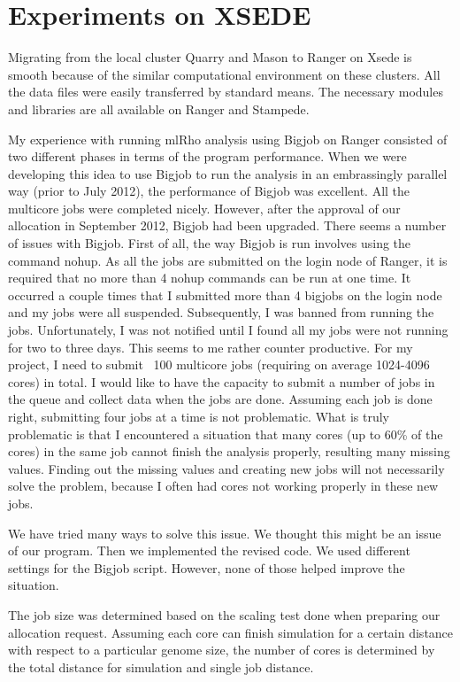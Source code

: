 \documentclass{sig-alternate}
\begin{document}
\section{Experiments on XSEDE}{\label{sec:experiments}
Migrating from the local cluster Quarry and Mason to Ranger on Xsede is smooth because of the similar computational environment on these clusters. All the data files were easily transferred by standard means. The necessary modules and libraries are all available on Ranger and Stampede.
 
My experience with running mlRho analysis using Bigjob on Ranger consisted of two different phases in terms of the program performance. When we were developing this idea to use Bigjob to run the analysis in an embrassingly parallel way (prior to July 2012), the performance of Bigjob was excellent. All the multicore jobs were completed nicely. However, after the approval of our allocation in September 2012, Bigjob had been upgraded. There seems a number of issues with Bigjob. First of all, the way Bigjob is run involves using the command nohup. As all the jobs are submitted on the login node of Ranger, it is required that no more than 4 nohup commands can be run at one time. It occurred a couple times that I submitted more than 4 bigjobs on the login node and my jobs were all suspended. Subsequently, I was banned from running the jobs. Unfortunately, I was not notified until I found all my jobs were not running for two to three days. This seems to me rather counter productive. For my project, I need to submit ~100 multicore jobs (requiring on average 1024-4096 cores) in total. I would like to have the capacity to submit a number of jobs in the queue and collect data when the jobs are done. Assuming each job is done right, submitting four jobs at a time is not problematic. What is truly problematic is that I encountered a situation that many cores (up to 60\% of the cores) in the same job cannot finish the analysis properly, resulting many missing values. Finding out the missing values and creating new jobs will not necessarily solve the problem, because I often had cores not working properly in these new jobs.
 
We have tried many ways to solve this issue. We thought this might be an issue of our program. Then we implemented the revised code. We used different settings for the Bigjob script. However, none of those helped improve the situation.

The job size was determined based on the scaling test done when preparing our allocation request. Assuming each core can finish simulation for a certain distance with respect to a particular genome size, the number of cores is determined by the total distance for simulation and single job distance.
 
}
\end{document}
